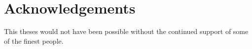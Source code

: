 \chapter*{Acknowledgements}

This theses would not have been possible without the continued support of some
of the finest people.
